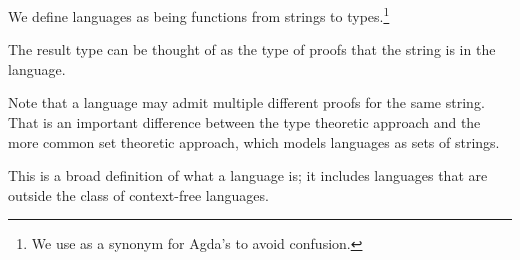 We define languages as being functions from strings to types.\footnote{We use  as a synonym for Agda's  to avoid confusion.}
\begin{code}[hide]%
\>[0]\AgdaSpace{}%
\AgdaSymbol{:}\AgdaSpace{}%
\<%
\end{code}
\begin{code}%
\>[0]\AgdaSpace{}%
\AgdaSymbol{=}\AgdaSpace{}%
\AgdaSpace{}%
\AgdaSpace{}%
\<%
\end{code}
The result type can be thought of as the type of proofs that the string is in the language.
\begin{remark}
Note that a language may admit multiple different proofs for the same string. That is an important difference between the type theoretic approach and the more common set theoretic approach, which models languages as sets of strings.
\end{remark}
This is a broad definition of what a language is; it includes languages that are outside the class of context-free languages. 
